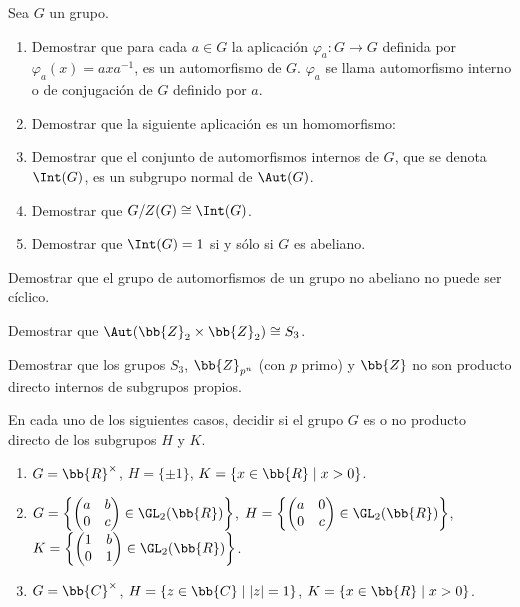\begin{ejercicio}
    Sea $G$ un grupo.
    \begin{enumerate}
        \item Demostrar que para cada $a\in G$ la aplicación $\varphi_a:G\to G$ definida por $\varphi_a(x)=axa^{-1}$, es un automorfismo de $G$. $\varphi_a$ se llama automorfismo interno o de conjugación de $G$ definido por $a$.
        \item Demostrar que la siguiente aplicación es un homomorfismo:
        \item Demostrar que el conjunto de automorfismos internos de $G$, que se denota $\Int(G)$, es un subgrupo normal de $\Aut(G)$.
        \item Demostrar que $G/Z(G)\cong \Int(G)$.
        \item Demostrar que $\Int(G)=1$ si y sólo si $G$ es abeliano.
    \end{enumerate}
\end{ejercicio}

\begin{ejercicio}
    Demostrar que el grupo de automorfismos de un grupo no abeliano no puede ser cíclico.
\end{ejercicio}

\begin{ejercicio}
    Demostrar que $\Aut(\bb{Z}_2\times \bb{Z}_2)\cong S_3$.
\end{ejercicio}

\begin{ejercicio}
    Demostrar que los grupos $S_3$, $\bb{Z}_{p^n}$ (con $p$ primo) y $\bb{Z}$ no son producto directo internos de subgrupos propios.
\end{ejercicio}

\begin{ejercicio}
    En cada uno de los siguientes casos, decidir si el grupo $G$ es o no producto directo de los subgrupos $H$ y $K$.
    \begin{enumerate}
        \item $G=\bb{R}^\times$, $H=\{\pm 1\}$, $K=\{x\in \bb{R}\mid x>0\}$.
        \item $G=\left\{\begin{pmatrix} a & b \\ 0 & c \end{pmatrix}\in \GL_2(\bb{R})\right\}$, $H=\left\{\begin{pmatrix} a & 0 \\ 0 & c \end{pmatrix}\in \GL_2(\bb{R})\right\}$, $K=\left\{\begin{pmatrix} 1 & b \\ 0 & 1 \end{pmatrix}\in \GL_2(\bb{R})\right\}$.
        \item $G=\bb{C}^\times$, $H=\left\{z\in \bb{C}\mid |z|=1\right\}$, $K=\left\{x\in \bb{R}\mid x>0\right\}$.
    \end{enumerate}
\end{ejercicio}

